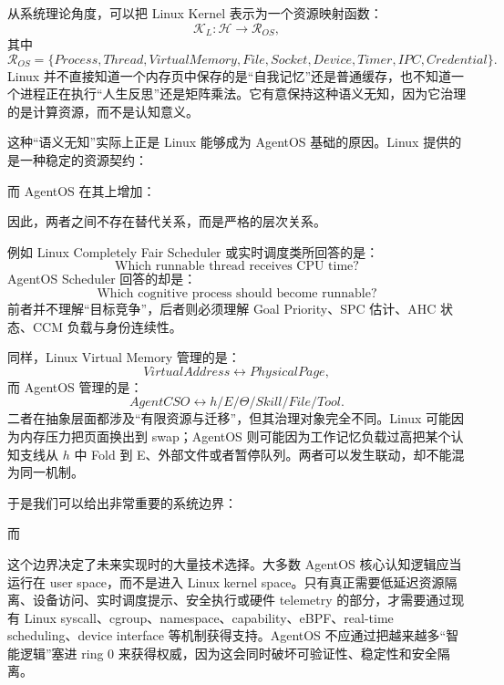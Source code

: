 从系统理论角度，可以把 Linux Kernel 表示为一个资源映射函数：
\[
\mathcal K_L:
\mathcal H
\rightarrow
\mathcal R_{OS},
\]
其中
\[
\mathcal R_{OS}
=
\{
Process,
Thread,
VirtualMemory,
File,
Socket,
Device,
Timer,
IPC,
Credential
\}.
\]
Linux 并不直接知道一个内存页中保存的是“自我记忆”还是普通缓存，也不知道一个进程正在执行“人生反思”还是矩阵乘法。它有意保持这种语义无知，因为它治理的是计算资源，而不是认知意义。

这种“语义无知”实际上正是 Linux 能够成为 AgentOS 基础的原因。Linux 提供的是一种稳定的资源契约：
\begin{statementbox}
\centering
{}
\end{statementbox}
而 AgentOS 在其上增加：
\begin{statementbox}
\centering
{}
\end{statementbox}

因此，两者之间不存在替代关系，而是严格的层次关系。

例如 Linux Completely Fair Scheduler 或实时调度类所回答的是：
\[
\text{Which runnable thread receives CPU time?}
\]
AgentOS Scheduler 回答的却是：
\[
\text{Which cognitive process should become runnable?}
\]
前者并不理解“目标竞争”，后者则必须理解 Goal Priority、SPC 估计、AHC 状态、CCM 负载与身份连续性。

同样，Linux Virtual Memory 管理的是：
\[
VirtualAddress
\leftrightarrow
PhysicalPage,
\]
而 AgentOS 管理的是：
\[
AgentCSO
\leftrightarrow
h/E/\Theta/Skill/File/Tool.
\]
二者在抽象层面都涉及“有限资源与迁移”，但其治理对象完全不同。Linux 可能因为内存压力把页面换出到 swap；AgentOS 则可能因为工作记忆负载过高把某个认知支线从 $h$ 中 Fold 到 E、外部文件或者暂停队列。两者可以发生联动，却不能混为同一机制。

于是我们可以给出非常重要的系统边界：
\begin{statementbox}
\centering
{}
\end{statementbox}
而
\begin{statementbox}
\centering
{}
\end{statementbox}

这个边界决定了未来实现时的大量技术选择。大多数 AgentOS 核心认知逻辑应当运行在 user space，而不是进入 Linux kernel space。只有真正需要低延迟资源隔离、设备访问、实时调度提示、安全执行或硬件 telemetry 的部分，才需要通过现有 Linux syscall、cgroup、namespace、capability、eBPF、real-time scheduling、device interface 等机制获得支持。AgentOS 不应通过把越来越多“智能逻辑”塞进 ring 0 来获得权威，因为这会同时破坏可验证性、稳定性和安全隔离。


